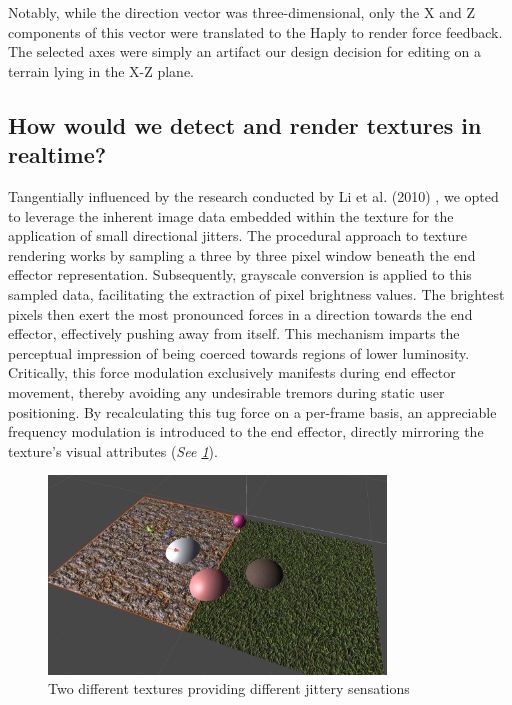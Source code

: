 Notably, while the direction vector was three-dimensional, only the X and Z components of this vector were translated to the Haply to render force feedback. The selected axes were simply an artifact our design decision for editing on a terrain lying in the X-Z plane.

\subsection{How would we detect and render textures in realtime?} \label{subsec:texture-rendering}

Tangentially influenced by the research conducted by Li et al. (2010) \cite{li2010image}, we opted to leverage the inherent image data embedded within the texture for the application of small directional jitters. The procedural approach to texture rendering works by sampling a three by three pixel window beneath the end effector representation. Subsequently, grayscale conversion is applied to this sampled data, facilitating the extraction of pixel brightness values. The brightest pixels then exert the most pronounced forces in a direction towards the end effector, effectively pushing away from itself. This mechanism imparts the perceptual impression of being coerced towards regions of lower luminosity. Critically, this force modulation exclusively manifests during end effector movement, thereby avoiding any undesirable tremors during static user positioning. By recalculating this tug force on a per-frame basis, an appreciable frequency modulation is introduced to the end effector, directly mirroring the texture's visual attributes (\textit{See \ref{fig:texture-rendering}}).

\begin{figure}[htbp]
    \centering
    \includegraphics[width=0.8\textwidth]{images/approach-texture-rendering.png} 
    \caption{Two different textures providing different jittery sensations}
    \label{fig:texture-rendering}
\end{figure}

